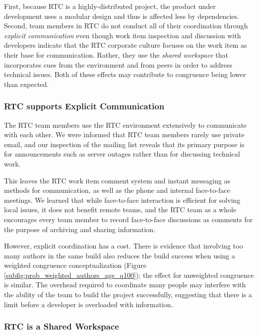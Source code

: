 First, because RTC is a highly-distributed project, the product under development uses a modular design \cite{maccormack2006} and thus is affected less by dependencies. Second, team members in RTC do not conduct all of their coordination through \emph{explicit communication} even though work item inspection and discussion with developers indicate that the RTC corporate culture focuses on the work item as their base for communication. Rather, they use the \emph{shared workspace} that incorporates cues from the environment and from peers in order to address technical issues. Both of these effects may contribute to congruence being lower than expected.

\subsubsection{RTC supports Explicit Communication}

The RTC team members use the RTC environment extensively to communicate with each other. We were informed that RTC team members rarely use private email, and our inspection of the mailing list reveals that its primary purpose is for announcements such as server outages rather than for discussing technical work.

This leaves the RTC work item comment system and instant messaging as methods for communication, as well as the phone and internal face-to-face meetings.
We learned that while face-to-face interaction is efficient for solving local issues, it does not benefit remote teams, and the RTC team as a whole encourages every team member to record face-to-face discussions as comments for the purpose of archiving and sharing information.

However, explicit coordination has a cost. There is evidence that involving too many authors in the same build also reduces the build success when using a weighted congruence conceptualization (Figure \ref{subfig:prob_weighted_authors_age_q100}); the effect for unweighted congruence is similar. The overhead required to coordinate many people may interfere with the ability of the team to build the project successfully, suggesting that there is a limit before a developer is overloaded with information.

\subsubsection{RTC is a Shared Workspace}

